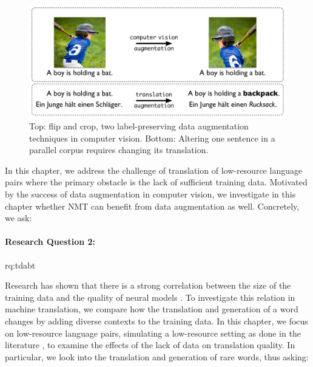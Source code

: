 \begin{figure}
\centering
\includegraphics[width=0.75\linewidth]{04-research-02/figs/augomni2.pdf}
\caption{Top: %
flip and crop, two label-preserving data augmentation techniques in computer vision.
Bottom: Altering one sentence in a parallel corpus requires changing its translation.}
\label{augfig}
\end{figure}


In this chapter, we address the challenge of translation of low-resource language pairs where the primary obstacle is the lack of sufficient training data.
Motivated by the success of data augmentation in computer vision, we investigate in this chapter whether NMT can benefit from data augmentation as well.
Concretely, we ask:


\paragraph{Research Question 2:} \acl{rq:tdabt} 

\medskip

 \noindent Research has shown that there is a strong correlation between the size of the training data and the quality of neural models \citep{Halevy:2009:UED:1525642.1525689}.
To investigate this relation in machine translation, we compare how the translation and generation of a word changes by adding diverse contexts to the training data.  
In this chapter, we focus on low-resource language pairs, simulating a low-resource setting as done in the literature \citep{Marton:2009:ISM:1699510.1699560,duong-EtAl:2015:EMNLP},  to examine the effects of the lack of data on translation quality.
In particular, we look into the translation and generation of rare words, thus asking: 
 
